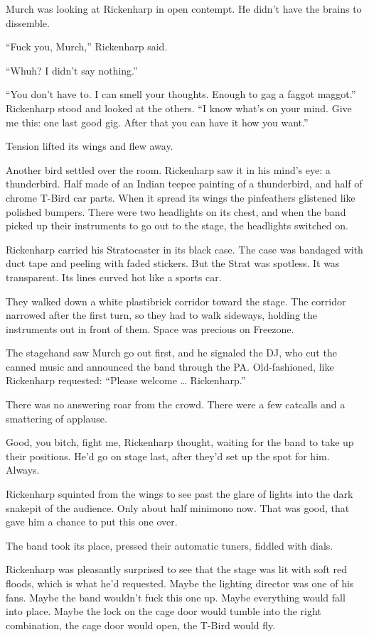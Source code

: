 Murch was looking at Rickenharp in open contempt. He didn’t have the brains to dissemble.

“Fuck you, Murch,” Rickenharp said.

“Whuh? I didn’t say nothing.”

“You don’t have to. I can smell your thoughts. Enough to gag a faggot maggot.” Rickenharp stood and looked at the others. “I know what’s on your mind. Give me this: one last good gig. After that you can have it how you want.”

Tension lifted its wings and flew away.

Another bird settled over the room. Rickenharp saw it in his mind’s eye: a thunderbird. Half made of an Indian teepee painting of a thunderbird, and half of chrome T-Bird car parts. When it spread its wings the pinfeathers glistened like polished bumpers. There were two headlights on its chest, and when the band picked up their instruments to go out to the stage, the headlights switched on.

Rickenharp carried his Stratocaster in its black case. The case was bandaged with duct tape and peeling with faded stickers. But the Strat was spotless. It was transparent. Its lines curved hot like a sports car.

They walked down a white plastibrick corridor toward the stage. The corridor narrowed after the first turn, so they had to walk sideways, holding the instruments out in front of them. Space was precious on Freezone.

The stagehand saw Murch go out first, and he signaled the DJ, who cut the canned music and announced the band through the PA. Old-fashioned, like Rickenharp requested: “Please welcome … Rickenharp.”

There was no answering roar from the crowd. There were a few catcalls and a smattering of applause.

Good, you bitch, fight me, Rickenharp thought, waiting for the band to take up their positions. He’d go on stage last, after they’d set up the spot for him. Always.

Rickenharp squinted from the wings to see past the glare of lights into the dark snakepit of the audience. Only about half minimono now. That was good, that gave him a chance to put this one over.

The band took its place, pressed their automatic tuners, fiddled with dials.

Rickenharp was pleasantly surprised to see that the stage was lit with soft red floods, which is what he’d requested. Maybe the lighting director was one of his fans. Maybe the band wouldn’t fuck this one up. Maybe everything would fall into place. Maybe the lock on the cage door would tumble into the right combination, the cage door would open, the T-Bird would fly.

